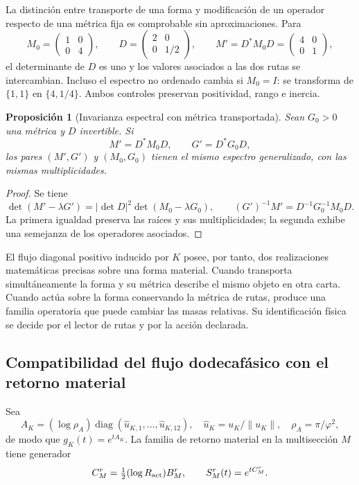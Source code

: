 \documentclass[a4paper,10pt]{article}
\newtheorem{proposition}[theorem]{Proposición}
\theoremstyle{definition}\newtheorem{definition}[theorem]{Definición}
\theoremstyle{remark}\newtheorem{remark}[theorem]{Observación}
\numberwithin{equation}{section}
\begin{document}
La distinción entre transporte de una forma y modificación de un
operador respecto de una métrica fija es comprobable sin aproximaciones.
Para
\[
 M_0=\begin{pmatrix}1&0\\0&4\end{pmatrix},\qquad
 D=\begin{pmatrix}2&0\\0&1/2\end{pmatrix},\qquad
 M'=D^*M_0D=\begin{pmatrix}4&0\\0&1\end{pmatrix},
\]
el determinante de \(D\) es uno y los valores asociados a las dos
rutas se intercambian. Incluso el espectro no ordenado cambia si
\(M_0=I\): se transforma de \(\{1,1\}\) en \(\{4,1/4\}\).
Ambos controles preservan positividad, rango e inercia.

\begin{proposition}[Invarianza espectral con métrica transportada]
Sean \(G_0>0\) una métrica y \(D\) invertible. Si
\[
 M'=D^*M_0D,\qquad G'=D^*G_0D,
\]
los pares \((M',G')\) y \((M_0,G_0)\) tienen el mismo espectro
generalizado, con las mismas multiplicidades.
\end{proposition}
\begin{proof}
Se tiene
\[
 \det(M'-\lambda G')=|\det D|^2\det(M_0-\lambda G_0),
 \qquad (G')^{-1}M'=D^{-1}G_0^{-1}M_0D.
\]
La primera igualdad preserva las raíces y sus multiplicidades; la
segunda exhibe una semejanza de los operadores asociados.
\end{proof}

El flujo diagonal positivo inducido por \(K\) posee, por tanto, dos
realizaciones matemáticas precisas sobre una forma material. Cuando
transporta simultáneamente la forma y su métrica describe el mismo
objeto en otra carta. Cuando actúa sobre la forma conservando la métrica
de rutas, produce una familia operatoria que puede cambiar las masas
relativas. Su identificación física se decide por el lector de rutas y
por la acción declarada.

\subsection{Compatibilidad del flujo dodecafásico con el retorno material}

Sea
\[
 A_K=(\log\rho_A)\operatorname{diag}(\widehat u_{K,1},\ldots,
       \widehat u_{K,12}),\quad
 \widehat u_K=u_K/\|u_K\|,\quad \rho_A=\pi/\varphi^2,
\]
de modo que \(g_K(t)=e^{tA_K}\). La familia de retorno material
en la multisección \(M\) tiene generador
\[
 C_M^r=\tfrac12(\log R_{\rm act})B_M^r,\qquad
 S_M^r(t)=e^{tC_M^r}.
\]
\end{document}
